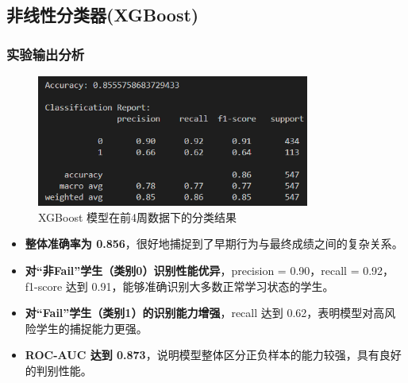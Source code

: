 \documentclass{SYSUReport}
\begin{document}
\subsection{非线性分类器(XGBoost)}
\subsubsection{实验输出分析}

\begin{figure}[htbp]
    \centering
    \includegraphics[width=0.8\textwidth]{figures/XGBoost_result.png}
    \caption{XGBoost 模型在前4周数据下的分类结果}
    \label{fig:xgboost_result}
\end{figure}

\begin{itemize}
    \item \textbf{整体准确率为 0.856}，很好地捕捉到了早期行为与最终成绩之间的复杂关系。
    \item \textbf{对“非Fail”学生（类别0）识别性能优异}，precision = 0.90，recall = 0.92，f1-score 达到 0.91，能够准确识别大多数正常学习状态的学生。
    \item \textbf{对“Fail”学生（类别1）的识别能力增强}，recall 达到 0.62，表明模型对高风险学生的捕捉能力更强。
    \item \textbf{ROC-AUC 达到 0.873}，说明模型整体区分正负样本的能力较强，具有良好的判别性能。
\end{itemize}
\end{document}
